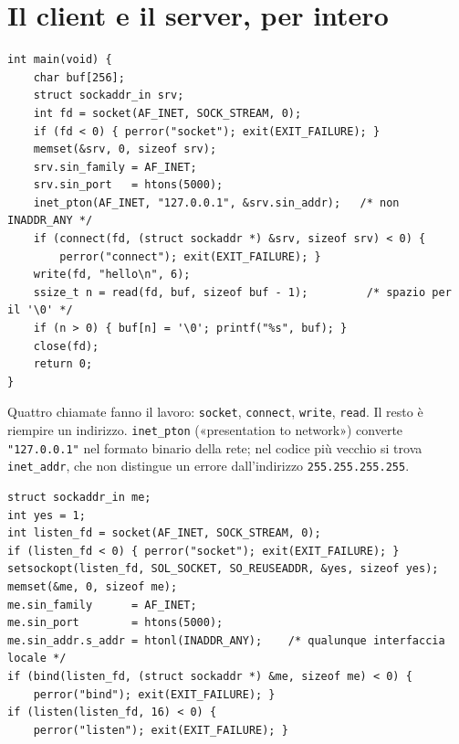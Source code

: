 
\section{Il client e il server, per intero}

\begin{lstlisting}[language={[POSIX]C}, style=wnumbers, title={client.c}]
int main(void) {
    char buf[256];
    struct sockaddr_in srv;
    int fd = socket(AF_INET, SOCK_STREAM, 0);
    if (fd < 0) { perror("socket"); exit(EXIT_FAILURE); }
    memset(&srv, 0, sizeof srv);
    srv.sin_family = AF_INET;
    srv.sin_port   = htons(5000);
    inet_pton(AF_INET, "127.0.0.1", &srv.sin_addr);   /* non INADDR_ANY */
    if (connect(fd, (struct sockaddr *) &srv, sizeof srv) < 0) {
        perror("connect"); exit(EXIT_FAILURE); }
    write(fd, "hello\n", 6);
    ssize_t n = read(fd, buf, sizeof buf - 1);         /* spazio per il '\0' */
    if (n > 0) { buf[n] = '\0'; printf("%s", buf); }
    close(fd);
    return 0;
}
\end{lstlisting}

Quattro chiamate fanno il lavoro: \texttt{socket}, \texttt{connect}, \texttt{write}, \texttt{read}. Il resto è riempire
un indirizzo. \texttt{inet\_pton} («presentation to network») converte \texttt{"127.0.0.1"} nel formato binario della
rete; nel codice più vecchio si trova \texttt{inet\_addr}, che non distingue un errore dall'indirizzo
\texttt{255.255.255.255}.

\begin{lstlisting}[language={[POSIX]C}, style=wnumbers, title={server.c: il socket di ascolto}]
struct sockaddr_in me;
int yes = 1;
int listen_fd = socket(AF_INET, SOCK_STREAM, 0);
if (listen_fd < 0) { perror("socket"); exit(EXIT_FAILURE); }
setsockopt(listen_fd, SOL_SOCKET, SO_REUSEADDR, &yes, sizeof yes);
memset(&me, 0, sizeof me);
me.sin_family      = AF_INET;
me.sin_port        = htons(5000);
me.sin_addr.s_addr = htonl(INADDR_ANY);    /* qualunque interfaccia locale */
if (bind(listen_fd, (struct sockaddr *) &me, sizeof me) < 0) {
    perror("bind"); exit(EXIT_FAILURE); }
if (listen(listen_fd, 16) < 0) {
    perror("listen"); exit(EXIT_FAILURE); }
\end{lstlisting}

